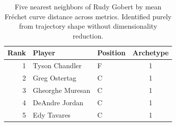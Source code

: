 \begin{table}[htbp]
  \centering\small
  \begin{tabular}{rllc}
    \toprule
    Rank & Player & Position & Archetype \\
    \midrule
    1 & Tyson Chandler & F & 1 \\
    2 & Greg Ostertag & C & 1 \\
    3 & Gheorghe Muresan & C & 1 \\
    4 & DeAndre Jordan & C & 1 \\
    5 & Edy Tavares & C & 1 \\
    \bottomrule
  \end{tabular}
  \caption{Five nearest neighbors of Rudy Gobert by mean Fr\'{e}chet curve distance across metrics. Identified purely from trajectory shape without dimensionality reduction.}
  \label{tab:Rudy_Gobert_frechet_curve_neighbors}
\end{table}


